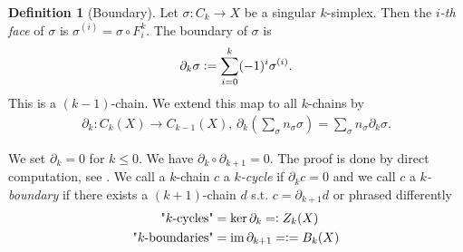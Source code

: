 \documentclass[12pt,a4paper]{article}
\theoremstyle{definition}
\newtheorem{definition}{Definition}
\newcommand{\real}{\mathbb{R}}
\begin{document}
\begin{definition}[Boundary]
    Let $\sigma: C_k \rightarrow X$ be a singular $k$-simplex. Then the 
    \textit{$i$-th face} of $\sigma$ is $\sigma^{(i)}=\sigma \circ F_i^k$.
    The boundary of $\sigma$ is 
    \begin{align*}
        \partial_k \sigma \vcentcolon= \sum\limits_{i=0}^k (-1)^i \sigma^{(i)}.
    \end{align*}
    This is a $(k-1)$-chain. We extend this map to all $k$-chains by
    \begin{align*}
        \partial_k: C_k(X) \rightarrow C_{k-1}(X),\,
        \partial_k(\sum_\sigma n_\sigma \sigma) = 
        \sum_\sigma n_\sigma \partial_k\sigma.
    \end{align*}
\end{definition}

We set $\partial_k = 0$ for $k\leq 0$. 
We have $\partial_k \circ \partial_{k+1} = 0$. The proof is done by direct 
computation, see
\cite[Ch.\,4, Lemma 1.6]{topology_and_geometry}.
We call a $k$-chain $c$ a \textit{$k$-cycle} if $\partial_k c = 0$ 
and we call $c$ 
a \textit{$k$-boundary} if there exists a $(k+1)$-chain $d$ s.t. 
$c = \partial_{k+1} d$ or phrased differently
\begin{align*}
    \text{"$k$-cycles"} &= \text{ker}\,\partial_k =\vcentcolon Z_k(X) \\
    \text{"$k$-boundaries"} &= \text{im}\,\partial_{k+1} =\vcentcolon= B_k(X)
\end{align*}






\end{document}
